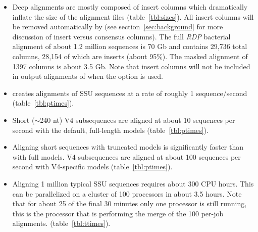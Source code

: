 \begin{itemize}

\item Deep alignments are mostly composed of insert columns which
  dramatically inflate the size of the alignment files
  (table~\ref{tbl:sizes}). All insert columns will be removed
  automatically by  (see section~\ref{sec:background}
  for more discussion of insert versus consensus columns). 
  The full \emph{RDP} bacterial alignment of about 1.2 million
  sequences is 70 Gb and contains 29,736 total columns, 28,154 
  of which are inserts (about 95\%). The masked alignment of 1397
  columns is about 3.5 Gb. Note that insert columns will not be
  included in output alignments of  when the
   option is used.


\item {} creates alignments of SSU sequences at a rate
  of roughly 1 sequence/second (table~\ref{tbl:ptimes}).

\item Short ($\sim$240 nt) V4 subsequences are aligned at about 10
  sequences per second with the default, full-length models (table~\ref{tbl:ptimes}).

\item Aligning short sequences with truncated models is significantly
  faster than with full models. V4 subsequences are aligned at about
  100 sequences per second with V4-specific models
  (table~\ref{tbl:ptimes}).

\item Aligning 1 million typical SSU sequences requires about 300
  CPU hours. This can be parallelized on a cluster of 100 processors
  in about 3.5 hours. Note that for about 25 of the final 30
  minutes only one processor is still running, this is the processor
  that is performing the merge of the 100 per-job alignments. 
  (table~\ref{tbl:ttimes}).

\end{itemize}


